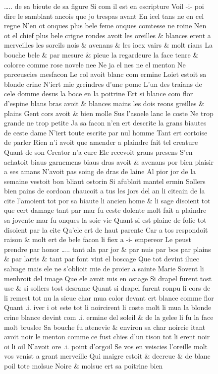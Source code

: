 \documentclass[
  letterpaper,
  DIV=11,
  numbers=noendperiod,
  oneside]{scrreprt}
\begin{document}
\begin{figure}
\ldots.. de sa bieute de sa figure Si com il est en escripture Voil -i-
poi dire le samblant ancois que jo trespas avant En icel tans ne en cel
regne N'en ot onques plus bele feme onques comtesse ne roine Nen ot el
chief plus bele crigne rondes avoit les oreilles \& blances erent a
merveilles les sorcils nois \& avenans \& les ioex vairs \& molt rians
La bouche bele \& par mesure \& pieue la regardeure la face tenre \&
coloree comme rose novele nee Ne ja el nes ne el menton Ne parceuscies
mesfacon Le col avoit blanc com ermine Loiet estoit sa blonde crine
N'iert mie greindres d'une pome L'un des traians de cele domme desus la
boce en la poitrine Ert si blance com flor d'espine blans bras avoit \&
blances mains les dois reons greilles \& plains Gent cors avoit \& bien
molle Sus l'asoele lanc le coste Ne trop grande ne trop petite Ja sa
facon n'en ert descrite la grans biautes de ceste dame N'iert toute
escrite par nul homme Tant ert cortoise de parler Rien n'i avoit que
amender a plaindre fait tel creature Quant de son Creator n'a cure Ele
recevoit grans presens S'en achatoit biaus garnemens biaus dras avoit \&
avenans por bien plaisir a ses amans N'avoit pas soing de dras de laine
Al pior jor de la semaine vestoit bon bliaut ostorin Si afubloit mantel
ermin Sollers bien pains de cordoan chaucoit a tus les jors del an li
citeain de la cite l'amoient tot por sa biaute li ancien home \& li sage
disoient tot que cert damage tant par mar fu ceste dolente molt fait a
plaindre sa jovente mar fu onques la soie vie Quant si est plaine de
folie tot disoient par la cite Qu'ele ert de haut parente Car a tos
respondoit raison \& molt ert de bele facon li fiex a -i- empereor Le
peust prendre par honor \ldots.. tant ala par jor \& par nuis par bos
par plains \& par larris \& tant par font vint el boscage Que tot devint
iluec salvage mais ele ne s'oblioit mie de proier a sainte Marie Sovent
li menbroit del image Que ele avoit mis en ostage Si drapel furent tost
use \& si sollers tost desrame Quant si drapel furent ronpu li cors de
li remest tot nu la sieue char mua color devant ert blance comme flor
Quant .i. iver i ot este tot li noircirent li coste molt li mua la
blonde crine blance devint com .i. ermine del soleil \& de la gelee li
fu la face molt bruslee Sa bouche fu atenevie \& environ sa char noircie
itant avoit noir le menton comme ce fust chies d'un tison tot li erent
noir oi li oil N'avoit ore .i. point d'orgoil Se vos en veiscies
l'oreille molt vos venist a grant merveille Qui maigre estoit \& decreue
\& de blanc poil tote molsue Noire \& molsue ert sa poitrine bien

\end{figure}
\end{document}
